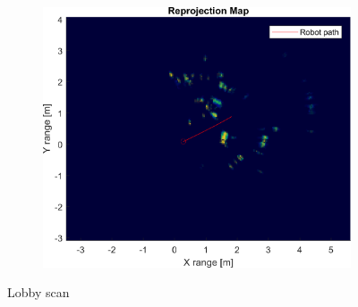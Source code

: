 \begin{figure}[htbp]
\begin{subfigure}[t]{0.475\linewidth}
    \end{subfigure}%
    \hfill%
    \begin{subfigure}[t]{0.475\linewidth}
        \centering
        \includegraphics[width=\linewidth,max height=.475\textheight]{gfx/results/lobby_reprojection.png}
    \end{subfigure}%
    \caption{Lobby scan}
\end{figure}

